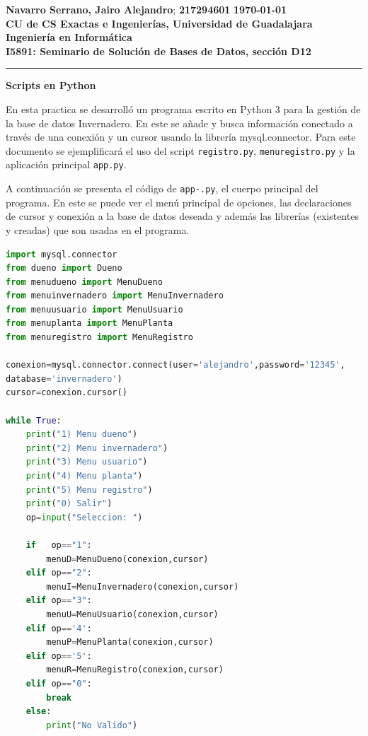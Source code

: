 \documentclass[fleqn,10pt]{article}
\newcommand{\nombre}{Navarro Serrano, Jairo Alejandro}
\newcommand{\codigo}{217294601}
\newcommand{\institucion}{CU de CS Exactas e Ingenierías, Universidad de Guadalajara}
\newcommand{\carrera}{Ingeniería en Informática}
\newcommand{\materia}{I5891: Seminario de Solución de Bases de Datos}
\newcommand{\fecha}{\today}
\newcommand{\titulo}{Scripts en Python}
\begin{document}
\textbf{\nombre}; \textbf{\codigo} \hfill \textbf{\fecha} \\
\textbf{\institucion} \\
\textbf{\carrera} \\ 
\textbf{\materia, sección D12} \\
\smallskip\hrule\bigskip
\begin{center}
\Large{\textbf{\titulo}}
\end{center}

En esta practica se desarrolló un programa escrito en Python 3 para la gestión de la base de datos Invernadero. En este se añade y busca información conectado a través de una conexión y un cursor usando la librería mysql.connector. Para este documento se ejemplificará el uso del script \texttt{registro.py}, \texttt{menuregistro.py} y la aplicación principal \texttt{app.py}.\par
A continuación se presenta el código de \texttt{app-.py}, el cuerpo principal del programa. En este se puede ver el menú principal de opciones, las declaraciones de cursor y conexión a la base de datos deseada y además las librerías (existentes y creadas) que son usadas en el programa.
\begin{lstlisting}[language=python,caption={\texttt{app.py}.}]
import mysql.connector
from dueno import Dueno
from menudueno import MenuDueno
from menuinvernadero import MenuInvernadero
from menuusuario import MenuUsuario
from menuplanta import MenuPlanta
from menuregistro import MenuRegistro

conexion=mysql.connector.connect(user='alejandro',password='12345',
database='invernadero')
cursor=conexion.cursor()

while True:
    print("1) Menu dueno")
    print("2) Menu invernadero")
    print("3) Menu usuario")
    print("4) Menu planta")
    print("5) Menu registro")
    print("0) Salir")
    op=input("Seleccion: ")

    if   op=="1":
        menuD=MenuDueno(conexion,cursor)
    elif op=="2":
        menuI=MenuInvernadero(conexion,cursor)
    elif op=="3":
        menuU=MenuUsuario(conexion,cursor)
    elif op=='4':
        menuP=MenuPlanta(conexion,cursor)
    elif op=='5':
        menuR=MenuRegistro(conexion,cursor)
    elif op=="0":
        break
    else:
        print("No Valido")
\end{lstlisting}
\end{document}
